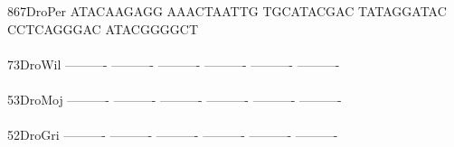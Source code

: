 \documentclass[11pt,twoside,reqno,a4paper]{article}
\begin{document}
{867\hspace*{2\charwidth}DroPer	ATACAAGAGG	AAACTAATTG	TGCATACGAC	TATAGGATAC	CCTCAGGGAC	ATACGGGGCT	\\
\hspace*{5\charwidth}\hspace*{7\charwidth}\hspace*{1\charwidth}\hspace*{1\charwidth}\hspace*{1\charwidth}\hspace*{1\charwidth}\hspace*{1\charwidth}\hspace*{1\charwidth}\\
73\hspace*{3\charwidth}DroWil	----------	----------	----------	----------	----------	----------	\\
\hspace*{5\charwidth}\hspace*{7\charwidth}\hspace*{1\charwidth}\hspace*{1\charwidth}\hspace*{1\charwidth}\hspace*{1\charwidth}\hspace*{1\charwidth}\hspace*{1\charwidth}\\
53\hspace*{3\charwidth}DroMoj	----------	----------	----------	----------	----------	----------	\\
\hspace*{5\charwidth}\hspace*{7\charwidth}\hspace*{1\charwidth}\hspace*{1\charwidth}\hspace*{1\charwidth}\hspace*{1\charwidth}\hspace*{1\charwidth}\hspace*{1\charwidth}\\
52\hspace*{3\charwidth}DroGri	----------	----------	----------	----------	----------	----------	\\
\hspace*{5\charwidth}\hspace*{7\charwidth}\hspace*{1\charwidth}\hspace*{1\charwidth}\hspace*{1\charwidth}\hspace*{1\charwidth}\hspace*{1\charwidth}\hspace*{1\charwidth}\\
}
\end{document}
